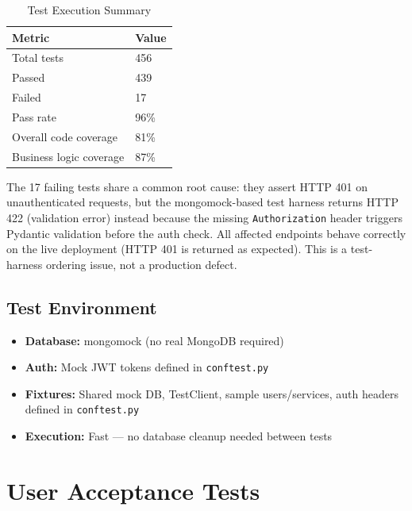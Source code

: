 \documentclass[11pt,a4paper]{report}
\begin{document}
\begin{table}[h]
    \centering
    \begin{tabularx}{\textwidth}{|l|X|}
        \hline
        \textbf{Metric}         & \textbf{Value} \\
        \hline
        Total tests             & 456            \\
        \hline
        Passed                  & 439            \\
        \hline
        Failed                  & 17             \\
        \hline
        Pass rate               & 96\%           \\
        \hline
        Overall code coverage   & 81\%           \\
        \hline
        Business logic coverage & 87\%           \\
        \hline
    \end{tabularx}
    \caption{Test Execution Summary}
\end{table}

\noindent The 17 failing tests share a common root cause: they assert HTTP 401 on unauthenticated requests, but the mongomock-based test harness returns HTTP 422 (validation error) instead because the missing \texttt{Authorization} header triggers Pydantic validation before the auth check. All affected endpoints behave correctly on the live deployment (HTTP 401 is returned as expected). This is a test-harness ordering issue, not a production defect.

\subsection{Test Environment}

\begin{itemize}
    \item \textbf{Database:} mongomock (no real MongoDB required)
    \item \textbf{Auth:} Mock JWT tokens defined in \texttt{conftest.py}
    \item \textbf{Fixtures:} Shared mock DB, TestClient, sample users/services, auth headers defined in \texttt{conftest.py}
    \item \textbf{Execution:} Fast --- no database cleanup needed between tests
\end{itemize}

\section{User Acceptance Tests}
\end{document}
